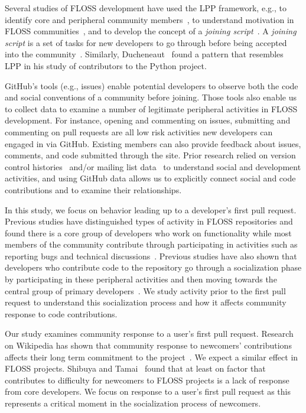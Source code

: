 \documentclass{sigchi}
\begin{document}
Several studies of FLOSS development have used the LPP framework, e.g., to
identify core and peripheral community members~\cite{huang_mining_2005}, to
understand motivation in FLOSS communities~\cite{ye_toward_2003}, and to develop
the concept of a \textit{joining script}~\cite{von_krogh_community_2003}. A
\textit{joining script} is a set of tasks for new developers to go through
before being accepted into the community~\cite{von_krogh_community_2003}.
Similarly, Ducheneaut~\cite{ducheneaut_socialization_2005} found a pattern that
resembles LPP in his study of contributors to the Python project.

GitHub's tools (e.g., issues) enable potential developers to observe both the
code and social conventions of a community before joining. Those tools also
enable us to collect data to examine a number of legitimate peripheral
activities in FLOSS development. For instance, opening and commenting on issues,
submitting and commenting on pull requests are all low risk activities new
developers can engaged in via GitHub. Existing members can also provide feedback
about issues, comments, and code submitted through the site. Prior research
relied on version control histories~\cite{huang_mining_2005} and/or mailing list
data~ \cite{ducheneaut_socialization_2005, von_krogh_community_2003} to
understand social and development activities, and using GitHub data allows us to
explicitly connect social and code contributions and to examine their
relationships.

In this study, we focus on behavior leading up to a developer's first pull
request.  Previous studies have distinguished types of activity in FLOSS
repositories and found there is a core group of developers who work on
functionality while most members of the community contribute through
participating in activities such as reporting bugs and technical
discussions~\cite{dinh2005freebsd, mockus2002two}. Previous studies have also
shown that developers who contribute code to the repository go through a
socialization phase by participating in these peripheral activities and then
moving towards the central group of primary
developers~\cite{ducheneaut_socialization_2005, von_krogh_community_2003}. We
study activity prior to the first pull request to understand this socialization
process and how it affects community response to code contributions.

Our study examines community response to a user's first pull request. Research
on Wikipedia has shown that community response to newcomers' contributions
affects their long term commitment to the project~\cite{choi2010socialization}.
We expect a similar effect in FLOSS projects. Shibuya and
Tamai~\cite{shibuya2009understanding} found that at least on factor that
contributes to difficulty for newcomers to FLOSS projects is a lack of response
from core developers. We focus on response to a user's first pull request as
this represents a critical moment in the socialization process of newcomers.
\end{document}
